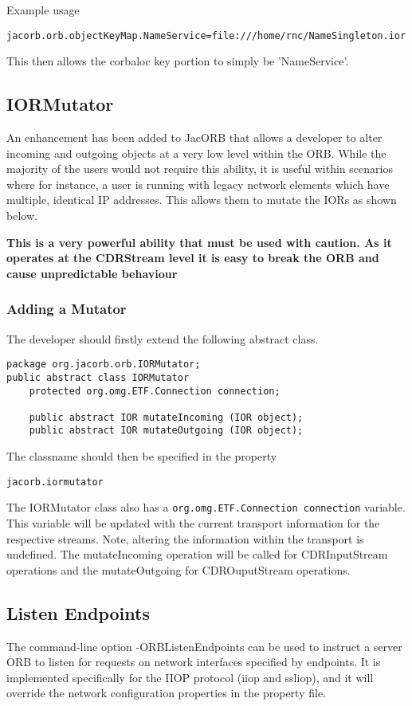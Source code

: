 Example usage

{\tt jacorb.orb.objectKeyMap.NameService=file:///home/rnc/NameSingleton.ior}

This then allows the corbaloc key portion to simply be 'NameService'.

\subsection{IORMutator}
\label{iorMutator}

An enhancement has been added to JacORB that allows a developer to alter incoming
and outgoing objects at a very low level within the ORB. While the majority of the
users would not require this ability, it is useful within scenarios where for instance,
a user is running with legacy network elements which have multiple, identical IP
addresses. This allows them to mutate the IORs as shown below.

\textbf{This is a very powerful ability that must be used with caution. As it operates
at the CDRStream level it is easy to break the ORB and cause unpredictable behaviour}

\subsubsection{Adding a Mutator}
The developer should firstly extend the following abstract class.
\begin{small}
\begin{verbatim}
package org.jacorb.orb.IORMutator;
public abstract class IORMutator
    protected org.omg.ETF.Connection connection;

    public abstract IOR mutateIncoming (IOR object);
    public abstract IOR mutateOutgoing (IOR object);
\end{verbatim}
\end{small}
The classname should then be specified in the property
\begin{verbatim}
jacorb.iormutator
\end{verbatim}

The IORMutator class also has a {\tt org.omg.ETF.Connection connection} variable. This
variable will be updated with the current transport information for the respective
streams. Note, altering the information within the transport is undefined. The
mutateIncoming operation will be called for CDRInputStream operations and the
mutateOutgoing for CDROuputStream operations.

\subsection{Listen Endpoints}
\label {Listen Endpoints}
The command-line option -ORBListenEndpoints can be used to instruct a server
ORB to listen for requests on network interfaces specified by endpoints.
It is implemented specifically for the IIOP protocol (iiop and ssliop), and
it will override the network configuration properties in the property file.

